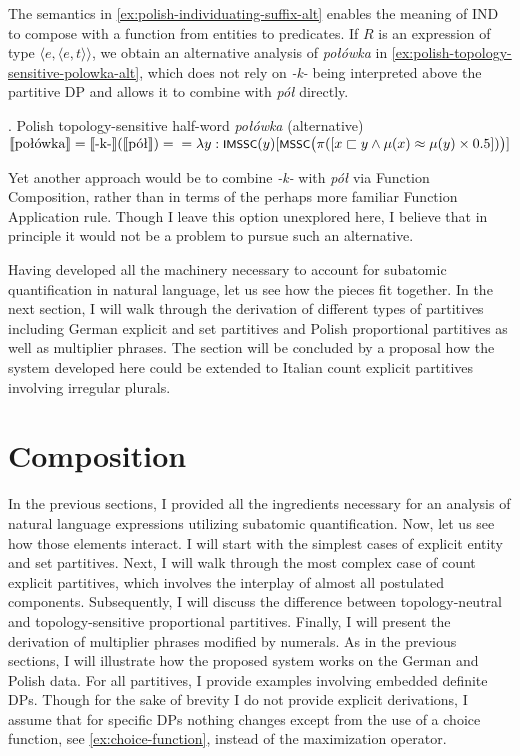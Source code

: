 	The semantics in \ref{ex:polish-individuating-suffix-alt} enables the meaning of IND to compose with a function from entities to predicates. If $R$ is an expression of type $\langle e,\langle e,t \rangle\rangle$, we obtain an alternative analysis of \textit{połówka} in \ref{ex:polish-topology-sensitive-polowka-alt}, which does not rely on \textit{-k-} being interpreted above the partitive DP and allows it to combine with \textit{pół} directly.
	
    \ex. Polish topology-sensitive half-word \textit{połówka} (alternative)\\
	$\llbracket \text{połówka}\rrbracket = \llbracket \text{-k-}\rrbracket(\llbracket \text{pół}\rrbracket) = \\ = \lambda y : \cnst{imssc}(y)[\cnst{mssc}\big(\pi([x \sqsubset y \wedge \mu(x) \approx \mu(y) \times 0.5])\big)]$\label{ex:polish-topology-sensitive-polowka-alt}
	
	Yet another approach would be to combine \textit{-k-} with \textit{pół} via Function Composition, rather than in terms of the perhaps more familiar Function Application rule. Though I leave this option unexplored here, I believe that in principle it would not be a problem to pursue such an alternative.
	
	Having developed all the machinery necessary to account for subatomic quantification in natural language, let us see how the pieces fit together. In the next section, I will walk through the derivation of different types of partitives including German explicit and set partitives and Polish proportional partitives as well as multiplier phrases. The section will be concluded by a proposal how the system developed here could be extended to Italian count explicit partitives involving irregular plurals.
	
	\section{Composition}\label{sec:composition}
	
	In the previous sections, I provided all the ingredients necessary for an analysis of natural language expressions utilizing subatomic quantification. Now, let us see how those elements interact. I will start with the simplest cases of explicit entity and set partitives. Next, I will walk through the most complex case of count explicit partitives, which involves the interplay of almost all postulated components. Subsequently, I will discuss the difference between topology-neutral and topology-sensitive proportional partitives. Finally, I will present the derivation of multiplier phrases modified by numerals. As in the previous sections, I will illustrate how the proposed system works on the German and Polish data. For all partitives, I provide examples involving embedded definite DPs. Though for the sake of brevity I do not provide explicit derivations, I assume that for specific DPs nothing changes except from the use of a choice function, see \ref{ex:choice-function}, instead of the maximization operator. 
	
